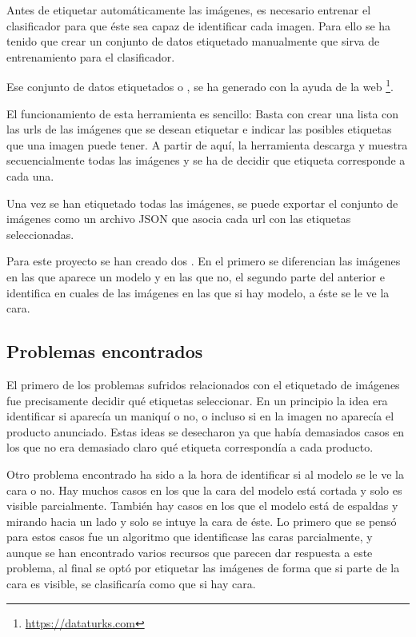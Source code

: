 Antes de etiquetar automáticamente las imágenes, es necesario entrenar el clasificador para que éste sea capaz de identificar cada imagen. Para ello se ha tenido que crear un conjunto de datos etiquetado manualmente que sirva de entrenamiento para el clasificador.

Ese conjunto de datos etiquetados o , se ha generado con la ayuda de la web \footnote{\url{https://dataturks.com}}.

El funcionamiento de esta herramienta es sencillo: Basta con crear una lista con las urls de las imágenes que se desean etiquetar e indicar las posibles etiquetas que una imagen puede tener. A partir de aquí, la herramienta descarga y muestra secuencialmente todas las imágenes y se ha de decidir que etiqueta corresponde a cada una.

Una vez se han etiquetado todas las imágenes, se puede exportar el conjunto de imágenes como un archivo JSON que asocia cada url con las etiquetas seleccionadas.

Para este proyecto se han creado dos . En el primero se diferencian las imágenes en las que aparece un modelo y en las que no, el segundo  parte del anterior e identifica en cuales de las imágenes en las que si hay modelo, a éste se le ve la cara.

\subsection{Problemas encontrados}

El primero de los problemas sufridos relacionados con el etiquetado de imágenes fue precisamente decidir qué etiquetas seleccionar. En un principio la idea era identificar si aparecía un maniquí o no, o incluso si en la imagen no aparecía el producto anunciado. Estas ideas se desecharon ya que había demasiados casos en los que no era demasiado claro qué etiqueta correspondía a cada producto.

Otro problema encontrado ha sido a la hora de identificar si al modelo se le ve la cara o no. Hay muchos casos en los que la cara del modelo está cortada y solo es visible parcialmente. También hay casos en los que el modelo está de espaldas y mirando hacia un lado y solo se intuye la cara de éste. Lo primero que se pensó para estos casos fue un algoritmo que identificase las caras parcialmente, y aunque se han encontrado varios recursos que parecen dar respuesta a este problema, al final se optó por etiquetar las imágenes de forma que si parte de la cara es visible, se clasificaría como que si hay cara.

